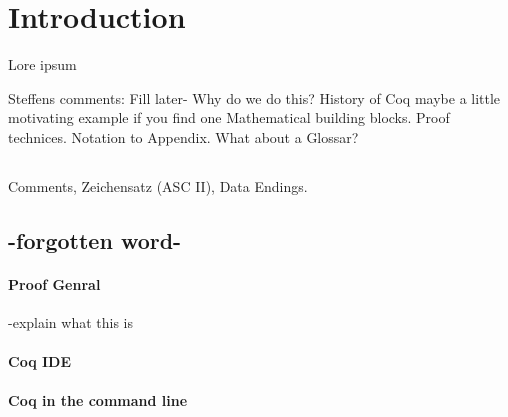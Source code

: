 
\section{Introduction}

Lore ipsum \cite{PACGGHSY}

Steffens comments:
Fill later-
 Why do we do this?
 History of Coq
 maybe a little motivating example if you find one
 Mathematical building blocks. Proof technices. Notation to Appendix.
 What about a Glossar?


\subsection{}

Comments, Zeichensatz (ASC II), Data Endings.

\subsection{-forgotten word-}



\paragraph{Proof Genral}
-explain what this is


\paragraph{Coq IDE}

\paragraph{Coq in the command line}




